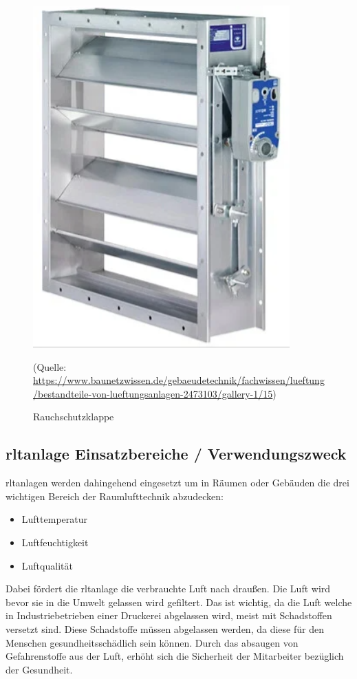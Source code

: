 \begin{figure}[H]
	\centering
	\includegraphics[width=0.5\linewidth]{Bilder/rauchschutzklappe}
	\caption{Rauchschutzklappe} 
	(Quelle: \url{	https://www.baunetzwissen.de/gebaeudetechnik/fachwissen/lueftung/bestandteile-von-lueftungsanlagen-2473103/gallery-1/15})
	\label{fig:Rauchschutzklappe}
\end{figure}

\cite[vgl.][]{baunetz_bestandteile_nodate:o.J.}

\subsection{\ac{rltanlage} Einsatzbereiche / Verwendungszweck}

\ac{rltanlage}n werden dahingehend eingesetzt um in Räumen oder Gebäuden die drei wichtigen Bereich der Raumlufttechnik abzudecken:

\begin{itemize}
	\item Lufttemperatur
	\item Luftfeuchtigkeit
	\item Luftqualität
\end{itemize} 

Dabei fördert die \ac{rltanlage} die verbrauchte Luft nach draußen. Die Luft wird bevor sie in die Umwelt gelassen wird gefiltert. Das ist wichtig, da die Luft welche in Industriebetrieben \zB einer Druckerei abgelassen wird, meist mit Schadstoffen versetzt sind. Diese Schadstoffe müssen abgelassen werden, da diese für den Menschen gesundheitsschädlich sein können. Durch das absaugen von Gefahrenstoffe aus der Luft, erhöht sich die Sicherheit der Mitarbeiter bezüglich der Gesundheit.

